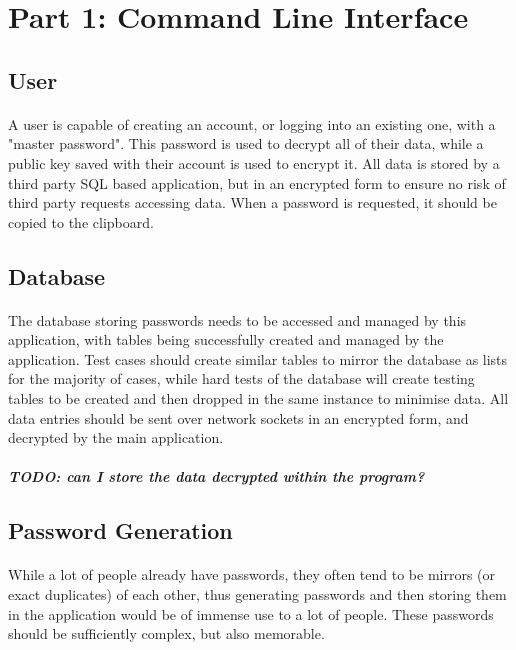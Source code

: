 \documentclass{article}
\begin{document}
	\newpage

	\section{Part 1: Command Line Interface}

	\subsection{User}
	\paragraph{}
A user is capable of creating an account, or logging into an existing one, with a "master password". This password is used to decrypt all of their data, while a public key saved with their account is used to encrypt it. All data is stored by a third party SQL based application, but in an encrypted form to ensure no risk of third party requests accessing data. When a password is requested, it should be copied to the clipboard.

	\subsection{Database}
	\paragraph{}
The database storing passwords needs to be accessed and managed by this application, with tables being successfully created and managed by the application. Test cases should create similar tables to mirror the database as lists for the majority of cases, while hard tests of the database will create testing tables to be created and then dropped in the same instance to minimise data. All data entries should be sent over network sockets in an encrypted form, and decrypted by the main application.

	\subparagraph{TODO: can I store the data decrypted within the program?}

	\subsection{Password Generation}
	\paragraph{}
While a lot of people already have passwords, they often tend to be mirrors (or exact duplicates) of each other, thus generating passwords and then storing them in the application would be of immense use to a lot of people. These passwords should be sufficiently complex, but also memorable.
\end{document}
